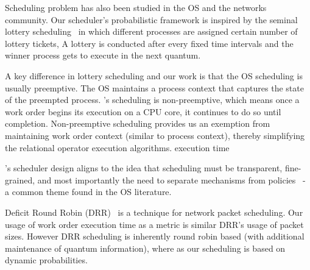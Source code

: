 Scheduling problem has also been studied in the OS and the networks community. 
Our scheduler's probabilistic framework is inspired by the seminal lottery scheduling~\cite{lottery-scheduling} %
in which different processes are assigned certain number of lottery tickets,
A lottery is conducted after every fixed time intervals and the winner process gets to execute in the next quantum. 

A key difference in lottery scheduling and our work is that the OS scheduling is usually preemptive. %
The OS maintains a process context that captures the state of the preempted process. 
\sys{}'s scheduling is non-preemptive, which means once a work order begins its execution on a CPU core, it continues to do so until completion.
Non-preemptive scheduling provides us an exemption from maintaining work order context (similar to process context), thereby simplifying the relational operator execution algorithms.
execution time

\sys{}'s scheduler design aligns to the idea that scheduling must be transparent, fine-grained, and most importantly the need to separate mechanisms from policies~\cite{LampsonS76} - a common theme found in the OS literature.

Deficit Round Robin (DRR)~\cite{shreedhar1996efficient} is a technique for network packet scheduling.
Our usage of work order execution time as a metric is similar DRR's usage of packet sizes. 
However DRR scheduling is inherently round robin based (with additional maintenance of quantum information), where as our scheduling is based on dynamic probabilities. 

